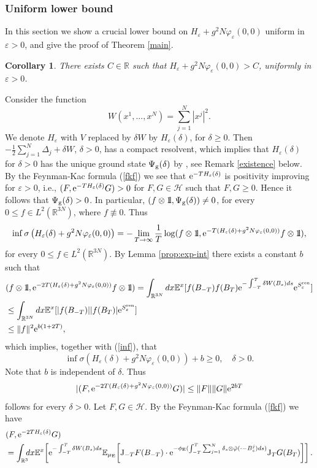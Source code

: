 \documentclass[12pt]{article}
\newtheorem{corollary}[theorem]{Corollary}
\providecommand{\bc}[1]{\begin{corollary}\label{#1}}
\providecommand{\ec}{\end{corollary}}
\def\bbbone{{\mathchoice {\rm 1\mskip-4mu l} {\rm 1\mskip-4mu l}
{\rm 1\mskip-4.5mu l} {\rm 1\mskip-5mu l}}}
\def\one{\bbbone}
\providecommand{\idx}{\int_{\BR} \!\!\! dx}
\newcommand{\Ebb}{{\mathbb E}}
\providecommand{\eq}[1]{\begin{equation}\label{#1}}
\providecommand{\en}{\end{equation}}
\providecommand{\BR}{{\mathbb{R}^3 }}
\providecommand{\BRN}{{\mathbb{R}^{3N} }}
\providecommand{\RR}{\mathbb{R}}
\providecommand{\kak}[1]{(\ref{#1})}
\providecommand{\LRN}{{L^2(\BRN)}}
\providecommand{\hn}{H}%
\providecommand{\ms}[1]{\mathscr{#1}}
\providecommand{\is}{\inf \s}
\providecommand{\gr}{\Psi_{\rm g}}
\providecommand{\JJ}{{\rm J}}
\providecommand{\half}{\frac{1}{2}}
\providecommand{\s}{\sigma}
\providecommand{\hhh}{\ms H} %
\providecommand{\e}{{\rm e}}
\providecommand{\1}{\mathbb{1}}
\providecommand {\s}  {\ensuremath {\mathcal{S}}}
\providecommand{\eps}{\varepsilon}
\providecommand{\ren}{{\rm ren}}
\newcounter {constant}
\begin{document}
\subsubsection{Uniform lower bound}
\label{223}
In this section we show a crucial lower bound on $H_\eps+g^2 N \varphi_\eps(0,0)$ uniform in
$\eps>0$, and give the proof of Theorem \ref{main}.



\bc{nelson}
There exists $C \in \RR$ such that $\hn_\eps+g^2 N\varphi_\eps(0,0)>C$, uniformly in $\eps>0$.
\ec
\proof
 Consider the function
$$
W(x^1,...,x^N)=\sum_{j=1}^N |x^j|^2.
$$
We denote $H_\eps$ with $V$ replaced by $\delta W$ by $H_\eps(\delta)$, for $\delta\geq0$.
Then $-\half \sum_{j=1}^N \Delta_j +\delta W$, $\delta>0$, has a compact resolvent, which implies
that $H_\eps(\delta)$ for $\delta>0$  has the unique ground state $\gr(\delta)$ by \cite{spo98,ger00},
see Remark \ref{existence} below. By the Feynman-Kac formula \kak{fkf} we see that $\e^{-TH_\eps(\delta)}$
is positivity improving for $\eps>0$, i.e., $(F, \e^{-TH_\eps(\delta)}G)>0$ for $F,G\in \hhh$ such that
$F, G\geq 0$. Hence it follows that $\gr(\delta)>0$. In particular, $(f\otimes \one, \gr(\delta))\neq 0$,
for every $0\leq  f\in\LRN$, where $f\not\equiv 0$. Thus
\eq{inf}
\is \left(H_\eps(\delta)+g^2 N\varphi_\eps(0,0)\right)
=
-\lim_{T\to \infty}\frac{1}{T}\log (f\otimes \one, \e^{-T(H_\eps(\delta)+g^2 N\varphi_\eps(0,0))}f\otimes\one),
\en
for every $0\leq f\in \LRN$. By Lemma \ref{prop:exp-int} there exists a constant $b$ such that
\begin{align*}
&(f\otimes \one, \e^{-2T(H_\eps(\delta)+g^2 N\varphi_\eps(0,0))}f\otimes \one)
=
\int_{\BRN} dx \Ebb^x[f(B_{-T}) f(B_{T})\e^{-\int_{-T}^{T}\delta W(B_s) ds}\e^{S_\eps^\ren}]\\
&\leq
\int_{\BRN} dx  \Ebb^x[|f(B_{-T})| |f(B_{T})| \e^{S_\eps^\ren}]\\
&\leq
\|f\|^2 \e^{b (1+2T)},
\end{align*}
which implies, together with \kak{inf},  that
\eq{delta3}
\is \left(H_\eps(\delta)+g^2 N\varphi_\eps(0,0)\right)+{b} \geq0,\quad \delta>0.
\en
Note that $b$ is independent of $\delta$. Thus
\eq{delta1}
|(F, \e^{-2T(H_\eps(\delta)+g^2 N\varphi_\eps(0,0))}G)|\leq \|F\| \|G\| \e^{2 b T}
\en
follows for every $\delta>0$. Let $F,G\in\hhh$. By the Feynman-Kac formula \kak{fkf} we have
\begin{align*}
&
(F, \e^{-2TH_\eps(\delta)}G)\\
&
=\idx \Ebb^x\!\left[\e^{-\int_{-T}^T \delta W(B_s) ds} \Ebb_{\mu_{\rm E}}\!
\left[\JJ_{-T} F(B_{-T})\cdot  \e^{-\phi_{\rm E}(\int_{-T}^T\sum_{j=1}^N \delta_s\otimes
\tilde\varphi(\cdot-B_s^j) ds)} \JJ_TG(B_T)\right]\right].
\end{align*}
\end{document}
